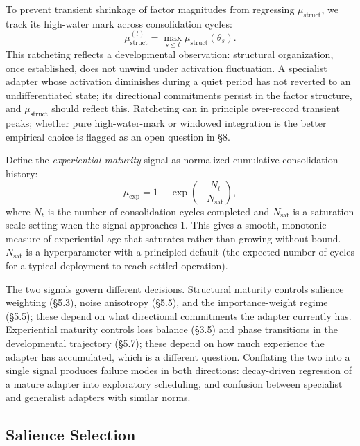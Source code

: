 \documentclass[11pt]{article}
\begin{document}
To prevent transient shrinkage of factor magnitudes from regressing $\mu_\text{struct}$, we track its high-water mark across consolidation cycles:
\begin{equation}
    \mu_\text{struct}^{(t)} = \max_{s \leq t} \mu_\text{struct}(\theta_s).
\end{equation}
This ratcheting reflects a developmental observation: structural organization, once established, does not unwind under activation fluctuation. A specialist adapter whose activation diminishes during a quiet period has not reverted to an undifferentiated state; its directional commitments persist in the factor structure, and $\mu_\text{struct}$ should reflect this. Ratcheting can in principle over-record transient peaks; whether pure high-water-mark or windowed integration is the better empirical choice is flagged as an open question in \S 8.

Define the \emph{experiential maturity} signal as normalized cumulative consolidation history:
\begin{equation}
    \mu_\text{exp} = 1 - \exp\!\left(-\frac{N_t}{N_\text{sat}}\right),
\end{equation}
where $N_t$ is the number of consolidation cycles completed and $N_\text{sat}$ is a saturation scale setting when the signal approaches 1. This gives a smooth, monotonic measure of experiential age that saturates rather than growing without bound. $N_\text{sat}$ is a hyperparameter with a principled default (the expected number of cycles for a typical deployment to reach settled operation).

The two signals govern different decisions. Structural maturity controls salience weighting (\S 5.3), noise anisotropy (\S 5.5), and the importance-weight regime (\S 5.5); these depend on what directional commitments the adapter currently has. Experiential maturity controls loss balance (\S 3.5) and phase transitions in the developmental trajectory (\S 5.7); these depend on how much experience the adapter has accumulated, which is a different question. Conflating the two into a single signal produces failure modes in both directions: decay-driven regression of a mature adapter into exploratory scheduling, and confusion between specialist and generalist adapters with similar norms.

\subsection{Salience Selection}
\end{document}
